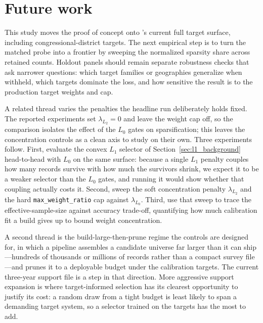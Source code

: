 \section{Future work}
\label{sec:future_work}

This study moves the proof of concept onto \microcosm{}'s current full target surface, including
congressional-district targets. The next empirical step is to turn the matched probe into a frontier by
sweeping the normalized sparsity share across retained counts. Holdout panels should remain separate
robustness checks that ask narrower
questions: which target families or geographies generalize when withheld, which targets dominate the loss,
and how sensitive the result is to the production target weights and cap.

A related thread varies the penalties the headline run deliberately holds fixed. The reported experiments
set $\lambda_{L_2}=0$ and leave the weight cap off, so the comparison isolates the effect of the $L_0$
gates on sparsification; this leaves the concentration controls as a clean axis to study on their own.
Three experiments follow. First, evaluate the convex $L_1$ selector of Section~\ref{sec:l1_background}
head-to-head with $L_0$ on the same surface: because a single $L_1$ penalty couples how many records
survive with how much the survivors shrink, we expect it to be a weaker selector than the $L_0$ gates,
and running it would show whether that coupling actually costs it. Second, sweep the soft concentration
penalty $\lambda_{L_2}$ and the hard \texttt{max\_weight\_ratio} cap against $\lambda_{L_0}$. Third, use
that sweep to trace the effective-sample-size against accuracy trade-off, quantifying how much calibration
fit a build gives up to bound weight concentration.

A second thread is the build-large-then-prune regime the controls are designed for, in which a pipeline
assembles a candidate universe far larger than it can ship---hundreds of thousands or millions of records
rather than a compact survey file---and prunes it to a deployable budget under the calibration targets.
The current three-year support file is a step in that direction. More aggressive support expansion is
where target-informed selection has its clearest opportunity to justify its cost: a random draw from a
tight budget is least likely to span a demanding target system, so a selector trained on the targets has
the most to add.

